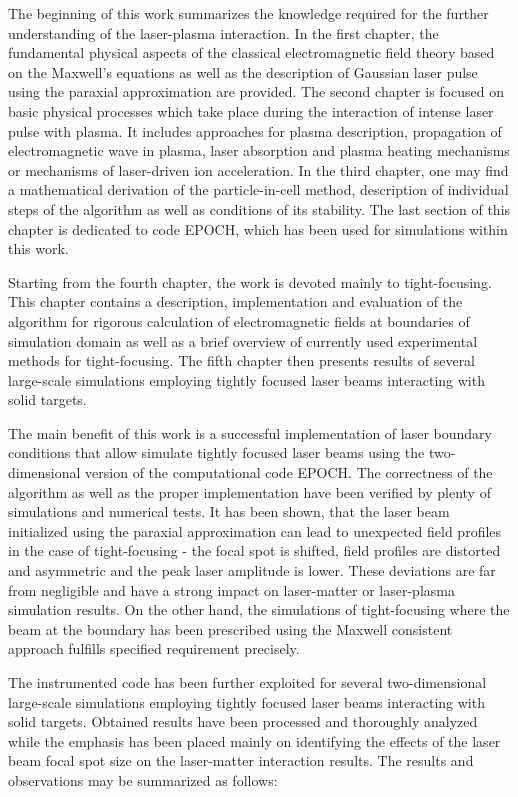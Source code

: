 The beginning of this work summarizes the knowledge required for the further understanding of the laser-plasma interaction. In the first chapter, the fundamental physical aspects of the classical electromagnetic field theory based on the Maxwell's equations as well as the description of Gaussian laser pulse using the paraxial approximation are provided. The second chapter is focused on basic physical processes which take place during the interaction of intense laser pulse with plasma. It includes approaches for plasma description, propagation of electromagnetic wave in plasma, laser absorption and plasma heating mechanisms or mechanisms of laser-driven ion acceleration. In the third chapter, one may find a mathematical derivation of the particle-in-cell method, description of individual steps of the algorithm as well as conditions of its stability. The last section of this chapter is dedicated to code EPOCH, which has been used for simulations within this work. 

Starting from the fourth chapter, the work is devoted mainly to tight-focusing. This chapter contains a description, implementation and evaluation of the algorithm for rigorous calculation of electromagnetic fields at boundaries of simulation domain as well as a brief overview of currently used experimental methods for tight-focusing. The fifth chapter then presents results of several large-scale simulations employing tightly focused laser beams interacting with solid targets.

The main benefit of this work is a successful implementation of laser boundary conditions that allow simulate tightly focused laser beams using the two-dimensional version of the computational code EPOCH. The correctness of the algorithm as well as the proper implementation have been verified by plenty of simulations and numerical tests. It has been shown, that the laser beam initialized using the paraxial approximation can lead to unexpected field profiles in the case of tight-focusing - the focal spot is shifted, field profiles are distorted and asymmetric and the peak laser amplitude is lower. These deviations are far from negligible and have a strong impact on laser-matter or laser-plasma simulation results. On the other hand, the simulations of tight-focusing where the beam at the boundary has been prescribed using the Maxwell consistent approach fulfills specified requirement precisely.

The instrumented code has been further exploited for several two-dimensional large-scale simulations employing tightly focused laser beams interacting with solid targets. Obtained results have been processed and thoroughly analyzed while the emphasis has been placed mainly on identifying the effects of the laser beam focal spot size on the laser-matter interaction results. The results and observations may be summarized as follows:

